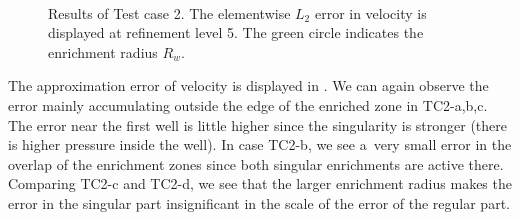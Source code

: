 \begin{figure}[!htb]
    \centering
     \\
    \caption[Error distribution in Test case 2.]
    {Results of Test case 2. The elementwise $L_2$ error in velocity is displayed at refinement level 5.
    The green circle indicates the enrichment radius $R_w$. }
    \label{fig:mh_tc2_error}
\end{figure}
%

The approximation error of velocity is displayed in . We can again observe
the error mainly accumulating outside the edge of the enriched zone in TC2-a,b,c.
The error near the first well is little higher since the singularity is stronger (there is higher pressure inside the well).
In case TC2-b, we see a~very small error in the overlap of the enrichment zones
since both singular enrichments are active there.
Comparing TC2-c and TC2-d, we see that the larger enrichment radius makes the error in the singular part insignificant
in the scale of the error of the regular part.


